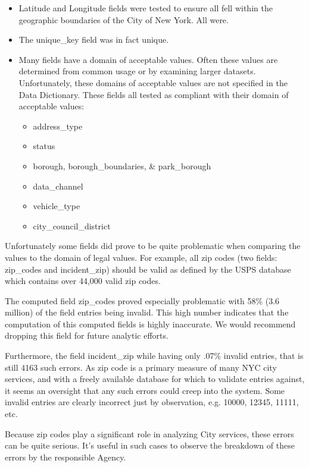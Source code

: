 \documentclass[12pt, titlepage]{article}
\begin{document}
\begin{itemize}
		\item Latitude and Longitude fields were tested to ensure all fell within the geographic boundaries of the City of New York. All were.
		\item The unique\_key field was in fact unique.
		\item Many fields have a domain of acceptable values. Often these values are determined from common usage or by examining
		larger datasets. Unfortunately, these domains of acceptable values are not specified in the Data Dictionary. These fields all tested as
		compliant with their domain of acceptable values:
			\begin{itemize}
				\item address\_type
				\item status
				\item borough, borough\_boundaries, \& park\_borough 
				\item data\_channel
				\item vehicle\_type
				\item city\_council\_district
			\end{itemize}
\end{itemize}	
 
 Unfortunately some fields did prove to be quite problematic when comparing the values to the domain of legal values.
 For example, all zip codes (two fields: zip\_codes and incident\_zip) should be valid as defined by the USPS database
 which contains over 44,000 valid zip codes.
 
 The computed field zip\_codes proved especially problematic with 58\% (3.6 million) of the field entries being invalid.
This high number indicates that the computation of this computed fields is highly inaccurate. We would recommend
dropping this field for future analytic efforts.

Furthermore, the field incident\_zip while having only .07\% invalid entries, that is still 4163 such errors. As zip code is
a primary measure of many NYC city services, and with a freely available database for which to validate entries
against, it seems an oversight that any such errors could creep into the system. Some invalid entries are 
clearly incorrect just by observation, e.g. 10000, 12345, 11111, etc. 

Because zip codes play a significant role in analyzing City services, these errors can be quite serious. It's useful in 
such cases to observe the breakdown of these errors by the responsible Agency. 
\end{document}
